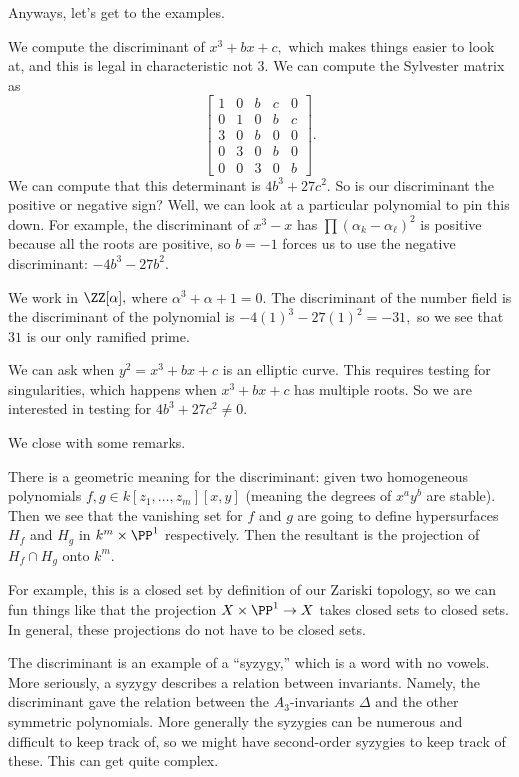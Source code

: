 \documentclass[../notes.tex]{subfiles}
\begin{document}
Anyways, let's get to the examples.
\begin{example}
	We compute the discriminant of $x^3+bx+c,$ which makes things easier to look at, and this is legal in characteristic not $3.$ We can compute the Sylvester matrix as
	\[\begin{bmatrix}
		1 & 0 & b & c & 0 \\
		0 & 1 & 0 & b & c \\
		3 & 0 & b & 0 & 0 \\
		0 & 3 & 0 & b & 0 \\
		0 & 0 & 3 & 0 & b
	\end{bmatrix}.\]
	We can compute that this determinant is $4b^3+27c^2.$ So is our discriminant the positive or negative sign? Well, we can look at a particular polynomial to pin this down. For example, the discriminant of $x^3-x$ has $\prod(\alpha_k-\alpha_\ell)^2$ is positive because all the roots are positive, so $b=-1$ forces us to use the negative discriminant: $\boxed{-4b^3-27b^2}.$
\end{example}
\begin{example}
	We work in $\ZZ[\alpha],$ where $\alpha^3+\alpha+1=0.$ The discriminant of the number field is the discriminant of the polynomial is $-4(1)^3-27(1)^2=-31,$ so we see that $31$ is our only ramified prime.
\end{example}
\begin{example}
	We can ask when $y^2=x^3+bx+c$ is an elliptic curve. This requires testing for singularities, which happens when $x^3+bx+c$ has multiple roots. So we are interested in testing for $4b^3+27c^2\ne0.$
\end{example}
We close with some remarks.
\begin{remark}
	There is a geometric meaning for the discriminant: given two homogeneous polynomials $f,g\in k[z_1,\ldots,z_m][x,y]$ (meaning the degrees of $x^ay^b$ are stable). Then we see that the vanishing set for $f$ and $g$ are going to define hypersurfaces $H_f$ and $H_g$ in $k^m\times\PP^1$ respectively. Then the resultant is the projection of $H_f\cap H_g$ onto $k^m.$
	
	For example, this is a closed set by definition of our Zariski topology, so we can fun things like that the projection $X\times\PP^1\to X$ takes closed sets to closed sets. In general, these projections do not have to be closed sets.
\end{remark}
The discriminant is an example of a ``syzygy,'' which is a word with no vowels. More seriously, a syzygy describes a relation between invariants. Namely, the discriminant gave the relation between the $A_3$-invariants $\Delta$ and the other symmetric polynomials. More generally the syzygies can be numerous and difficult to keep track of, so we might have second-order syzygies to keep track of these. This can get quite complex.
\end{document}
